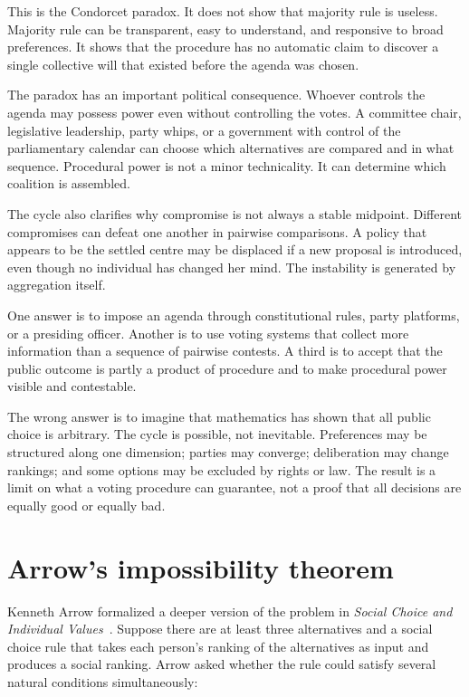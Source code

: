 ﻿\documentclass[12pt,a4paper]{book}
\begin{document}
This is the Condorcet paradox.  It does not show that majority rule is
useless.  Majority rule can be transparent, easy to understand, and
responsive to broad preferences.  It shows that the procedure has no
automatic claim to discover a single collective will that existed before
the agenda was chosen.

The paradox has an important political consequence.  Whoever controls the
agenda may possess power even without controlling the votes.  A committee
chair, legislative leadership, party whips, or a government with control of
the parliamentary calendar can choose which alternatives are compared and
in what sequence.  Procedural power is not a minor technicality.  It can
determine which coalition is assembled.

The cycle also clarifies why compromise is not always a stable midpoint.
Different compromises can defeat one another in pairwise comparisons.  A
policy that appears to be the settled centre may be displaced if a new
proposal is introduced, even though no individual has changed her mind.
The instability is generated by aggregation itself.

One answer is to impose an agenda through constitutional rules, party
platforms, or a presiding officer.  Another is to use voting systems that
collect more information than a sequence of pairwise contests.  A third is
to accept that the public outcome is partly a product of procedure and to
make procedural power visible and contestable.

The wrong answer is to imagine that mathematics has shown that all public
choice is arbitrary.  The cycle is possible, not inevitable.  Preferences
may be structured along one dimension; parties may converge; deliberation
may change rankings; and some options may be excluded by rights or law.  The
result is a limit on what a voting procedure can guarantee, not a proof that
all decisions are equally good or equally bad.

\section{Arrow's impossibility theorem}

Kenneth Arrow formalized a deeper version of the problem in \emph{Social
Choice and Individual Values}~\cite{Arrow1963}.  Suppose there are at least
three alternatives and a social choice rule that takes each person's ranking
of the alternatives as input and produces a social ranking.  Arrow asked
whether the rule could satisfy several natural conditions simultaneously:
\end{document}
